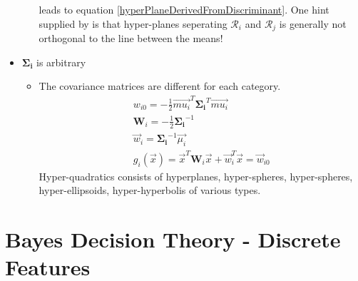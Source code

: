 \documentclass[11pt]{article}
\begin{document}
\begin{itemize}
\begin{itemize}
\begin{equation}
		\end{equation}
		leads to equation \ref{hyperPlaneDerivedFromDiscriminant}.  One hint supplied by \cite{duda-hart-stork} is that hyper-planes seperating $\mathcal{R}_i$ and $\mathcal{R}_j$ is generally not orthogonal to the line between the means!  %
	\end{itemize}
	\item $\mathbf{\Sigma_i}$ is arbitrary
	\begin{itemize}
		\item The covariance matrices are different for each category.  %
		\begin{eqnarray}
			w_{i0} = -\frac{1}{2}\vec{mu_i}^T \mathbf{\Sigma_i}^T \vec{mu_i} \label{thresholdForIthCategoryArbitraryCase}\\
			\mathbf{W}_i = -\frac{1}{2} \mathbf{\Sigma_i} ^{-1}  \\
			\vec{w}_i = \mathbf{\Sigma_i} ^{-1} \vec{\mu_i} \\
			g_i(\vec{x}) = \vec{x}^T \mathbf{W}_i \vec{x} + \vec{w}_i^T \vec{x} = \vec{w}_{i0} 
		\end{eqnarray}
		Hyper-quadratics consists of hyperplanes, hyper-spheres, hyper-spheres, hyper-ellipsoids, hyper-hyperbolis of various types.  %
		
	\end{itemize}
	
	
\end{itemize}



\section{Bayes Decision Theory - Discrete Features}
\end{document}
